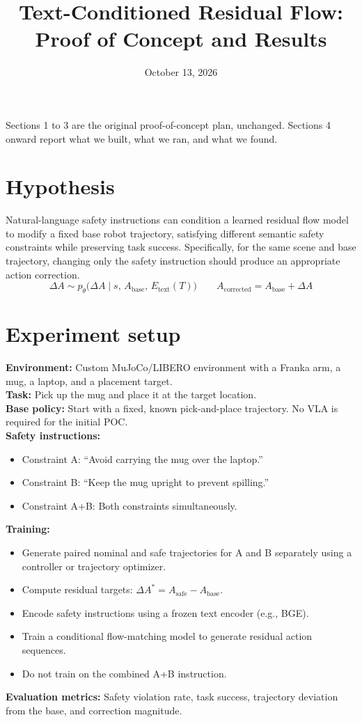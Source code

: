\documentclass[11pt]{article}
\title{Text-Conditioned Residual Flow: Proof of Concept and Results}
\date{October 13, 2026}
\author{}
\begin{document}
\maketitle

\noindent Sections 1 to 3 are the original proof-of-concept plan, unchanged.
Sections 4 onward report what we built, what we ran, and what we found.

\section{Hypothesis}

Natural-language safety instructions can condition a learned residual flow model to modify a
fixed base robot trajectory, satisfying different semantic safety constraints while preserving
task success.
Specifically, for the same scene and base trajectory, changing only the safety instruction should
produce an appropriate action correction.
\[
\Delta A \sim p_\theta\big(\Delta A \mid s,\, A_{\text{base}},\, E_{\text{text}}(T)\big)
\qquad
A_{\text{corrected}} = A_{\text{base}} + \Delta A
\]

\section{Experiment setup}

\textbf{Environment:} Custom MuJoCo/LIBERO environment with a Franka arm, a mug, a laptop, and a
placement target.\\
\textbf{Task:} Pick up the mug and place it at the target location.\\
\textbf{Base policy:} Start with a fixed, known pick-and-place trajectory. No VLA is required for
the initial POC.\\
\textbf{Safety instructions:}
\begin{itemize}
  \item Constraint A: ``Avoid carrying the mug over the laptop.''
  \item Constraint B: ``Keep the mug upright to prevent spilling.''
  \item Constraint A+B: Both constraints simultaneously.
\end{itemize}
\textbf{Training:}
\begin{itemize}
  \item Generate paired nominal and safe trajectories for A and B separately using a controller or
        trajectory optimizer.
  \item Compute residual targets: $\Delta A^* = A_{\text{safe}} - A_{\text{base}}$.
  \item Encode safety instructions using a frozen text encoder (e.g., BGE).
  \item Train a conditional flow-matching model to generate residual action sequences.
  \item Do not train on the combined A+B instruction.
\end{itemize}
\textbf{Evaluation metrics:} Safety violation rate, task success, trajectory deviation from the
base, and correction magnitude.
\end{document}
